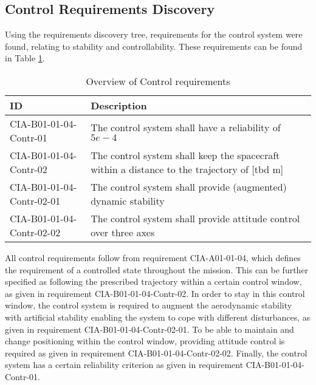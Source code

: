 \subsection{Control Requirements Discovery} \label{sec:req-control}
Using the requirements discovery tree, requirements for the control system were found, relating to stability and controllability. These requirements can be found in Table \ref{tab:controlreq}.

\begin{table}[H]
	\caption{Overview of Control requirements}
	\begin{tabular}{|p{}|p{}|}
		\hline
		ID         					&	Description																							\\ \hline \hline
		CIA-B01-01-04-Contr-01		&	The control system shall have a reliability of $5e-4$            									\\ \hline
		CIA-B01-01-04-Contr-02 		&	The control system shall keep the spacecraft within a distance to the trajectory of [\gls{tbd} m]	\\ \hline	
		CIA-B01-01-04-Contr-02-01 	&	The control system shall provide (augmented) dynamic stability       								\\ \hline
		CIA-B01-01-04-Contr-02-02 	&	The control system shall provide attitude control over three axes         							\\ \hline	
	\end{tabular}
	\label{tab:controlreq}
\end{table}

All control requirements follow from requirement CIA-A01-01-04, which defines the requirement of a controlled state throughout the mission. 
This can be further specified as following the prescribed trajectory within a certain control window, as given in requirement CIA-B01-01-04-Contr-02. 
In order to stay in this control window, the control system is required to augment the aerodynamic stability with artificial stability enabling the system to cope with different disturbances, as given in requirement CIA-B01-01-04-Contr-02-01. 
To be able to maintain and change positioning within the control window, providing attitude control is required as given in requirement CIA-B01-01-04-Contr-02-02. 
Finally, the control system has a certain reliability criterion as given in requirement CIA-B01-01-04-Contr-01.